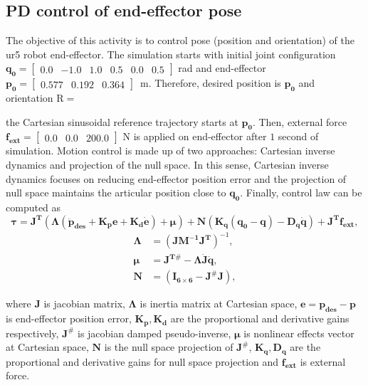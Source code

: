 \graphicspath{{images/act_3.1/}}
\subsection{PD control of end-effector pose}
The objective of this activity is to control pose (position and orientation) of the ur5 robot end-effector. The simulation starts with initial joint configuration $\mathbf{q_0}=\begin{bmatrix} 0.0 & -1.0 & 1.0 & 0.5 & 0.0 & 0.5 \end{bmatrix}$ rad and end-effector $\mathbf{p_0}=\begin{bmatrix}  0.577 &   0.192 &   0.364 \end{bmatrix}$~m. Therefore, desired position is $\mathbf{p_0}$ and orientation $\mathrm{R} = $ 

the Cartesian sinusoidal reference trajectory starts at $\mathbf{p_0}$. Then, external force $\mathbf{f_{ext}}=\begin{bmatrix} 0.0 & 0.0 & 200.0\end{bmatrix}$ N is applied on end-effector after $1$ second of simulation. Motion control is made up of two approaches: Cartesian inverse dynamics and projection of the null space. In this sense, Cartesian inverse dynamics focuses on reducing end-effector position error and the projection of null space maintains the articular position close to $\mathbf{q_0}$. Finally, control law can be computed as 
\begin{equation}
	\boldsymbol{\tau}
	= \mathbf{J^T} (\boldsymbol{\Lambda}( \mathbf{\ddot{p}_{des}} + \mathbf{K_p e} + \mathbf{K_d \dot{e}}) + \boldsymbol{\mu})+ \mathbf{N} \left(\mathbf{K_q(q_0-q) - D_q \dot{q}} \right) + \mathbf{J^T}\mathbf{f_{ext}} ,
	\label{eq:cartesian_idyn_N_f_ext}
\end{equation} 
\begin{align*}
	\boldsymbol{\Lambda} &= (\mathbf{J M^{-1} J^{T}})^{-1}, \\
	\boldsymbol{\mu} &= \mathbf{J^{T\#}} - \boldsymbol{\Lambda}\mathbf{\dot{J}\dot{q}}, \\
	\mathbf{N} &=(\mathbf{I_{6 \times 6}} - \mathbf{J^{\#} J} ),
\end{align*}

\noindent where $\mathbf{J}$ is jacobian matrix, $\boldsymbol{\Lambda}$ is inertia matrix at Cartesian space, $\mathbf{e}=\mathbf{p_{des} - p}$ is end-effector position error, $\mathbf{K_p, K_d}$ are the proportional and derivative gains respectively, $\mathbf{J^{\#}}$ is jacobian damped pseudo-inverse, $\boldsymbol{\mu}$ is nonlinear effects vector at Cartesian space, $\mathbf{N}$ is the null space projection of $\mathbf{J^{\#}}$, $\mathbf{K_q, D_q}$ are the proportional and derivative gains for null space projection and $\mathbf{f_{ext}}$ is external force. \vspace{.5cm}

